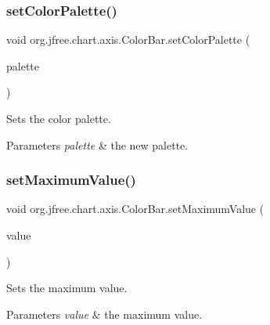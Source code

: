 \subsubsection{\texorpdfstring{set\+Color\+Palette()}{setColorPalette()}}
{\footnotesize\ttfamily void org.\+jfree.\+chart.\+axis.\+Color\+Bar.\+set\+Color\+Palette (\begin{DoxyParamCaption}\item[{\mbox{\hyperlink{classorg_1_1jfree_1_1chart_1_1plot_1_1_color_palette}{Color\+Palette}}}]{palette }\end{DoxyParamCaption})}

Sets the color palette.


\begin{DoxyParams}{Parameters}
{\em palette} & the new palette. \\
\hline
\end{DoxyParams}
\mbox{\label{classorg_1_1jfree_1_1chart_1_1axis_1_1_color_bar_a340823e876258fb78bb62ba19b66694e}} 
\subsubsection{\texorpdfstring{set\+Maximum\+Value()}{setMaximumValue()}}
{\footnotesize\ttfamily void org.\+jfree.\+chart.\+axis.\+Color\+Bar.\+set\+Maximum\+Value (\begin{DoxyParamCaption}\item[{double}]{value }\end{DoxyParamCaption})}

Sets the maximum value.


\begin{DoxyParams}{Parameters}
{\em value} & the maximum value. \\
\hline
\end{DoxyParams}
\mbox{\label{classorg_1_1jfree_1_1chart_1_1axis_1_1_color_bar_ac0d65654c2637194a7e0a08e2c99a40f}} 
